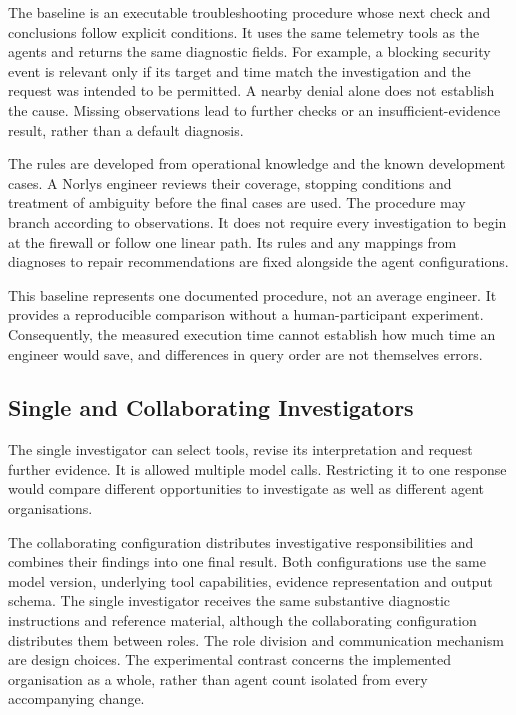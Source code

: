 The baseline is an executable troubleshooting procedure whose next check
and conclusions follow explicit conditions. It uses the same telemetry
tools as the agents and returns the same diagnostic fields. For example,
a blocking security event is relevant only if its target and time match
the investigation and the request was intended to be permitted. A nearby
denial alone does not establish the cause. Missing observations lead to
further checks or an insufficient-evidence result, rather than a default
diagnosis.

The rules are developed from operational knowledge and the known
development cases. A Norlys engineer reviews their coverage, stopping
conditions and treatment of ambiguity before the final cases are used.
The procedure may branch according to observations. It does not require
every investigation to begin at the firewall or follow one linear path.
Its rules and any mappings from diagnoses to repair recommendations are
fixed alongside the agent configurations.

This baseline represents one documented procedure, not an average
engineer. It provides a reproducible comparison without a human-participant
experiment. Consequently, the measured execution time cannot establish
how much time an engineer would save, and differences in query order are
not themselves errors.

\subsection{Single and Collaborating Investigators}

The single investigator can select tools, revise its interpretation and
request further evidence. It is allowed multiple model calls. Restricting
it to one response would compare different opportunities to investigate
as well as different agent organisations.

The collaborating configuration distributes investigative responsibilities
and combines their findings into one final result. Both configurations
use the same model version, underlying tool capabilities, evidence
representation and output schema. The single investigator receives the
same substantive diagnostic instructions and reference material, although
the collaborating configuration distributes them between roles. The role
division and communication mechanism are design choices. The experimental
contrast concerns the implemented organisation as a whole, rather than
agent count isolated from every accompanying change.


